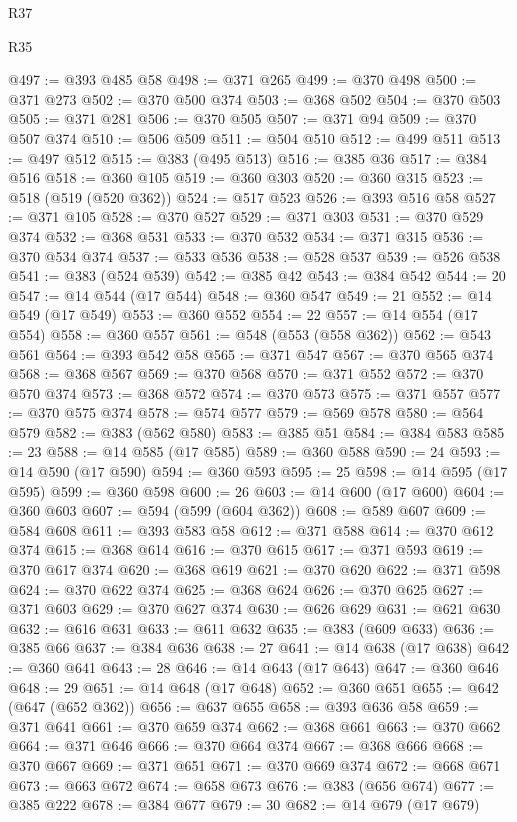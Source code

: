 \begin{lexlean}{R37}
\begin{lexlean}{R35}
\begin{coremodule}
{{{{{{{{{{{{{{{{{{{{{{{{{{{{{{{{{{{{{{{{{{{{{{{{{{{{@497 := @393 @485 @58
@498 := @371 @265
@499 := @370 @498
@500 := @371 @273
@502 := @370 @500 @374
@503 := @368 @502
@504 := @370 @503
@505 := @371 @281
@506 := @370 @505
@507 := @371 @94
@509 := @370 @507 @374
@510 := @506 @509
@511 := @504 @510
@512 := @499 @511
@513 := @497 @512
@515 := @383 (@495 @513)
@516 := @385 @36
@517 := @384 @516
@518 := @360 @105
@519 := @360 @303
@520 := @360 @315
@523 := @518 (@519 (@520 @362))
@524 := @517 @523
@526 := @393 @516 @58
@527 := @371 @105
@528 := @370 @527
@529 := @371 @303
@531 := @370 @529 @374
@532 := @368 @531
@533 := @370 @532
@534 := @371 @315
@536 := @370 @534 @374
@537 := @533 @536
@538 := @528 @537
@539 := @526 @538
@541 := @383 (@524 @539)
@542 := @385 @42
@543 := @384 @542
@544 := 20
@547 := @14 @544 (@17 @544)
@548 := @360 @547
@549 := 21
@552 := @14 @549 (@17 @549)
@553 := @360 @552
@554 := 22
@557 := @14 @554 (@17 @554)
@558 := @360 @557
@561 := @548 (@553 (@558 @362))
@562 := @543 @561
@564 := @393 @542 @58
@565 := @371 @547
@567 := @370 @565 @374
@568 := @368 @567
@569 := @370 @568
@570 := @371 @552
@572 := @370 @570 @374
@573 := @368 @572
@574 := @370 @573
@575 := @371 @557
@577 := @370 @575 @374
@578 := @574 @577
@579 := @569 @578
@580 := @564 @579
@582 := @383 (@562 @580)
@583 := @385 @51
@584 := @384 @583
@585 := 23
@588 := @14 @585 (@17 @585)
@589 := @360 @588
@590 := 24
@593 := @14 @590 (@17 @590)
@594 := @360 @593
@595 := 25
@598 := @14 @595 (@17 @595)
@599 := @360 @598
@600 := 26
@603 := @14 @600 (@17 @600)
@604 := @360 @603
@607 := @594 (@599 (@604 @362))
@608 := @589 @607
@609 := @584 @608
@611 := @393 @583 @58
@612 := @371 @588
@614 := @370 @612 @374
@615 := @368 @614
@616 := @370 @615
@617 := @371 @593
@619 := @370 @617 @374
@620 := @368 @619
@621 := @370 @620
@622 := @371 @598
@624 := @370 @622 @374
@625 := @368 @624
@626 := @370 @625
@627 := @371 @603
@629 := @370 @627 @374
@630 := @626 @629
@631 := @621 @630
@632 := @616 @631
@633 := @611 @632
@635 := @383 (@609 @633)
@636 := @385 @66
@637 := @384 @636
@638 := 27
@641 := @14 @638 (@17 @638)
@642 := @360 @641
@643 := 28
@646 := @14 @643 (@17 @643)
@647 := @360 @646
@648 := 29
@651 := @14 @648 (@17 @648)
@652 := @360 @651
@655 := @642 (@647 (@652 @362))
@656 := @637 @655
@658 := @393 @636 @58
@659 := @371 @641
@661 := @370 @659 @374
@662 := @368 @661
@663 := @370 @662
@664 := @371 @646
@666 := @370 @664 @374
@667 := @368 @666
@668 := @370 @667
@669 := @371 @651
@671 := @370 @669 @374
@672 := @668 @671
@673 := @663 @672
@674 := @658 @673
@676 := @383 (@656 @674)
@677 := @385 @222
@678 := @384 @677
@679 := 30
@682 := @14 @679 (@17 @679)
}}}}}}}}}}}}}}}}}}}}}}}}}}}}}}}}}}}}}}}}}}}}}}}}}}}}
\end{coremodule}
\end{lexlean}
\end{lexlean}
